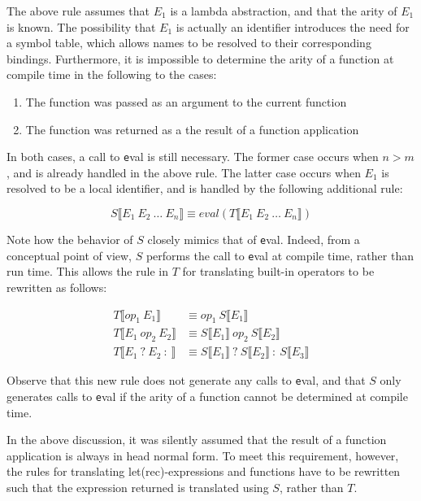 The above rule assumes that $E_1$ is a lambda abstraction, and that the arity of
$E_1$ is known. The possibility that $E_1$ is actually an identifier introduces
the need for a symbol table, which allows names to be resolved to their
corresponding bindings. Furthermore, it is impossible to determine the arity of
a function at compile time in the following to the cases:

\begin{enumerate}
\item The function was passed as an argument to the current function
\item The function was returned as a the result of a function application
\end{enumerate}

In both cases, a call to {\texttt eval} is still necessary. The former case
occurs when $n > m$, and is already handled in the above rule. The latter case
occurs when $E_1$ is resolved to be a local identifier, and is handled by the
following additional rule:

\[ S \llbracket E_1 \: E_2 \: \ldots \: E_n \rrbracket \equiv
   eval(T \llbracket E_1 \: E_2 \: \ldots \: E_n \rrbracket) \]

Note how the behavior of $S$ closely mimics that of {\texttt eval}. Indeed,
from a conceptual point of view, $S$ performs the call to {\texttt eval} at
compile time, rather than run time. This allows the rule in $T$ for translating
built-in operators to be rewritten as follows:

\begin{align*}
T \llbracket op_1 \: E_1 \rrbracket &
        \equiv op_1 \: S \llbracket E_1 \rrbracket \\
T \llbracket E_1 \: op_2 \: E_2 \rrbracket &
        \equiv S \llbracket E_1 \rrbracket \: op_2 \:
               S \llbracket E_2 \rrbracket \\
T \llbracket E_1 \: ? \: E_2 \: : \: \rrbracket &
        \equiv S \llbracket E_1 \rrbracket \: ? \:
               S \llbracket E_2 \rrbracket \: : \:
               S \llbracket E_3 \rrbracket 
\end{align*}

Observe that this new rule does not generate any calls to {\texttt eval}, and
that $S$ only generates calls to {\texttt eval} if the arity of a function
cannot be determined at compile time.

In the above discussion, it was silently assumed that the result of a function
application is always in head normal form. To meet this requirement, however,
the rules for translating let(rec)-expressions and functions have to be
rewritten such that the expression returned is translated using $S$, rather than
$T$.



